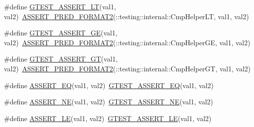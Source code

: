 \begin{DoxyCompactItemize}
\item 
\#define \mbox{\hyperlink{_obj__test_2lib_2googletest-master_2googletest_2include_2gtest_2gtest_8h_a5a75667e637febd18e5f7d4f3abf55e8}{G\+T\+E\+S\+T\+\_\+\+A\+S\+S\+E\+R\+T\+\_\+\+LT}}(val1,  val2)~\mbox{\hyperlink{_obj__test_2lib_2googletest-release-1_88_81_2googletest_2include_2gtest_2gtest__pred__impl_8h_ac452685a1a98ea3d96eb956a062ee210}{A\+S\+S\+E\+R\+T\+\_\+\+P\+R\+E\+D\+\_\+\+F\+O\+R\+M\+A\+T2}}(\+::testing\+::internal\+::\+Cmp\+Helper\+LT, val1, val2)
\item 
\#define \mbox{\hyperlink{_obj__test_2lib_2googletest-master_2googletest_2include_2gtest_2gtest_8h_a55373d99c079ff1b894e2eb5bcd15c5a}{G\+T\+E\+S\+T\+\_\+\+A\+S\+S\+E\+R\+T\+\_\+\+GE}}(val1,  val2)~\mbox{\hyperlink{_obj__test_2lib_2googletest-release-1_88_81_2googletest_2include_2gtest_2gtest__pred__impl_8h_ac452685a1a98ea3d96eb956a062ee210}{A\+S\+S\+E\+R\+T\+\_\+\+P\+R\+E\+D\+\_\+\+F\+O\+R\+M\+A\+T2}}(\+::testing\+::internal\+::\+Cmp\+Helper\+GE, val1, val2)
\item 
\#define \mbox{\hyperlink{_obj__test_2lib_2googletest-master_2googletest_2include_2gtest_2gtest_8h_a088b9056fd1c1f316b41c22f64deb33a}{G\+T\+E\+S\+T\+\_\+\+A\+S\+S\+E\+R\+T\+\_\+\+GT}}(val1,  val2)~\mbox{\hyperlink{_obj__test_2lib_2googletest-release-1_88_81_2googletest_2include_2gtest_2gtest__pred__impl_8h_ac452685a1a98ea3d96eb956a062ee210}{A\+S\+S\+E\+R\+T\+\_\+\+P\+R\+E\+D\+\_\+\+F\+O\+R\+M\+A\+T2}}(\+::testing\+::internal\+::\+Cmp\+Helper\+GT, val1, val2)
\item 
\#define \mbox{\hyperlink{_obj__test_2lib_2googletest-master_2googletest_2include_2gtest_2gtest_8h_a1a6db8b1338ee7040329322b77779086}{A\+S\+S\+E\+R\+T\+\_\+\+EQ}}(val1,  val2)~\mbox{\hyperlink{_obj__test_2lib_2googletest-release-1_88_81_2googletest_2include_2gtest_2gtest_8h_a8a7a47387090810cdfe78933d348182d}{G\+T\+E\+S\+T\+\_\+\+A\+S\+S\+E\+R\+T\+\_\+\+EQ}}(val1, val2)
\item 
\#define \mbox{\hyperlink{_obj__test_2lib_2googletest-master_2googletest_2include_2gtest_2gtest_8h_aa866c8dece57912e6f51495ed3e8d8d5}{A\+S\+S\+E\+R\+T\+\_\+\+NE}}(val1,  val2)~\mbox{\hyperlink{_obj__test_2lib_2googletest-release-1_88_81_2googletest_2include_2gtest_2gtest_8h_a6fa9bb2b6731eba8f481e40e9e4931b3}{G\+T\+E\+S\+T\+\_\+\+A\+S\+S\+E\+R\+T\+\_\+\+NE}}(val1, val2)
\item 
\#define \mbox{\hyperlink{_obj__test_2lib_2googletest-master_2googletest_2include_2gtest_2gtest_8h_a775643748feff0b490aae651d041e971}{A\+S\+S\+E\+R\+T\+\_\+\+LE}}(val1,  val2)~\mbox{\hyperlink{_obj__test_2lib_2googletest-release-1_88_81_2googletest_2include_2gtest_2gtest_8h_abef04dcd4a0259d378de7b3b3ffb6730}{G\+T\+E\+S\+T\+\_\+\+A\+S\+S\+E\+R\+T\+\_\+\+LE}}(val1, val2)

\end{DoxyCompactItemize}

